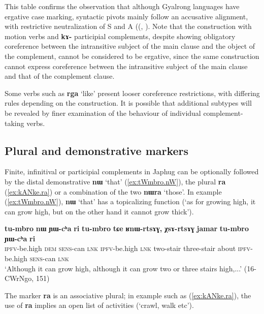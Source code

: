 \documentclass[oneside,a4paper,11pt]{article}
\newcommand{\ipa}[1]{\textbf{\phon#1}} %
\newcommand{\jpg}[2]{\ipa{#1} `#2'} %
\begin{document}
This table confirms the observation that although Gyalrong languages have ergative case marking, syntactic pivots mainly follow an accusative alignment, with restrictive neutralization of S and A ((\citealt[275]{vanvalin97syntax}, \citealt{jackson03caodeng, jacques16relatives}). Note that the construction with motion verbs and \ipa{kɤ-} participial complements, despite showing obligatory coreference between the intransitive subject of the main clause and the object of the complement, cannot be considered to be ergative, since the same construction cannot express coreference between the intransitive subject of the main clause and that of the complement clause.

Some verbs such as \jpg{rga}{like} present looser coreference restrictions, with differing rules depending on the construction. It is possible that additional subtypes will be revealed by finer examination of the behaviour of individual complement-taking verbs.

 \subsection{Plural and demonstrative markers} \label{sec:demonstratives}
Finite, infinitival or participial complements in Japhug can be optionally followed by the distal demonstrative \jpg{nɯ}{that} (\ref{ex:tWmbro.nW}), the plural \ipa{ra} (\ref{ex:kANke.ra}) or a combination of the two \jpg{nɯra}{those}. In example (\ref{ex:tWmbro.nW}), \jpg{nɯ}{that}  has a topicalizing function (`as for growing high, it can grow high, but on the other hand it cannot grow thick').

 \begin{exe}
\ex \label{ex:tWmbro.nW}
\gll 
\ipa{tu-mbro} 	\ipa{nɯ} 	\ipa{ɲɯ-cʰa} 	\ipa{ri} 	\ipa{tu-mbro} 	\ipa{tɕe} 	\ipa{ʁnɯ-rtsɤɣ,} 	\ipa{χsɤ-rtsɤɣ} 	\ipa{jamar} 	\ipa{tu-mbro} 	\ipa{ɲɯ-cʰa} 	\ipa{ri}  \\
\textsc{ipfv}-be.high \textsc{dem} \textsc{sens}-can \textsc{lnk} \textsc{ipfv}-be.high \textsc{lnk} two-stair three-stair about \textsc{ipfv}-be.high  \textsc{sens}-can \textsc{lnk} \\
\glt `Although it can grow high, although it can grow two or three stairs high,...' (16-CWrNgo, 151)
\end{exe}
 
The marker \ipa{ra} is an associative plural; in example such as (\ref{ex:kANke.ra}), the use of \ipa{ra} implies an open list of activities (`crawl, walk etc'). 
 
\end{document}
